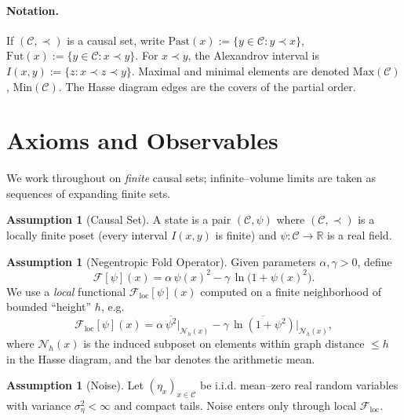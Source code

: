 \documentclass[12pt]{article}
\theoremstyle{definition}
\newtheorem{assumption}[theorem]{Assumption}
\newcommand{\C}{\mathcal{C}}
\newcommand{\R}{\mathbb{R}}
\newcommand{\Ps}{\psi}
\newcommand{\Fop}{\mathcal{F}}
\newcommand{\Ixy}{I(x,y)}
\begin{document}
\paragraph{Notation.} If \((\C,\prec)\) is a causal set, write \(\mathrm{Past}(x) := \{y\in\C: y\prec x\}\), \(\mathrm{Fut}(x):=\{y\in\C: x\prec y\}\). For \(x\prec y\), the Alexandrov interval is \(\Ixy:=\{z: x\prec z\prec y\}\). Maximal and minimal elements are denoted \(\mathrm{Max}(\C)\), \(\mathrm{Min}(\C)\). The Hasse diagram edges are the covers of the partial order.

\section{Axioms and Observables}
\label{sec:axioms}
We work throughout on \emph{finite} causal sets; infinite--volume limits are taken as sequences of expanding finite sets.

\begin{assumption}[Causal Set]\label{ass:cst}
A state is a pair \((\C,\Ps)\) where \((\C,\prec)\) is a locally finite poset (every interval \(\Ixy\) is finite) and \(\Ps: \C\to\R\) is a real field.
\end{assumption}

\begin{assumption}[Negentropic Fold Operator]\label{ass:fold}
Given parameters \(\alpha,\gamma>0\), define
\begin{equation}\label{eq:fold}
\Fop[\Ps](x)
= \alpha\,\Ps(x)^2 - \gamma\,\ln\bigl(1+\Ps(x)^2\bigr).
\end{equation}
We use a \emph{local} functional \(\Fop_{\mathrm{loc}}[\Ps](x)\) computed on a finite neighborhood of bounded ``height'' \(h\), e.g.
\begin{equation}\label{eq:localF}
\Fop_{\mathrm{loc}}[\Ps](x)
= \alpha\,\overline{\Ps^2}\big|_{\mathcal{N}_h(x)}
- \gamma\,\overline{\ln(1+\Ps^2)}\big|_{\mathcal{N}_h(x)},
\end{equation}
where \(\mathcal{N}_h(x)\) is the induced subposet on elements within graph distance \(\le h\) in the Hasse diagram, and the bar denotes the arithmetic mean.
\end{assumption}

\begin{assumption}[Noise]\label{ass:noise}
Let \((\eta_x)_{x\in\C}\) be i.i.d. mean--zero real random variables with variance \(\sigma_\eta^2<\infty\) and compact tails. Noise enters only through local \(\Fop_{\mathrm{loc}}\).
\end{assumption}
\end{document}
